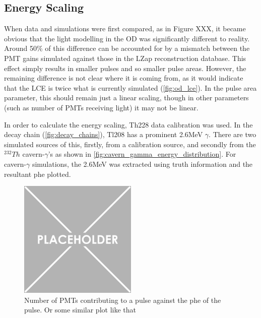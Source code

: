 \subsection{Energy Scaling}
\par
When data and simulations were first compared, as in Figure XXX, it became obvious that the light modelling in the OD was significantly different to reality.
Around 50\% of this difference can be accounted for by a mismatch between the PMT gains simulated against those in the LZap reconstruction database.
This effect simply results in smaller pulses and so smaller pulse areas.
However, the remaining difference is not clear where it is coming from, as it would indicate that the LCE is twice what is currently simulated (\autoref{fig:od_lce}).
In the pulse area parameter, this should remain just a linear scaling, though in other parameters (such as number of PMTs receiving light) it may not be linear.

\par
In order to calculate the energy scaling, Th228 data calibration was used. 
In the decay chain (\autoref{fig:decay_chains}), Tl208 has a prominent 2.6MeV $\gamma$. 
There are two simulated sources of this, firstly, from a calibration source, and secondly from the ${}^{232}Th$ cavern-$\gamma$'s as shown in \autoref{fig:cavern_gamma_energy_distribution}.
For cavern-$\gamma$ simulations, the 2.6MeV was extracted using truth information and the resultant phe plotted.


\begin{figure}
    \centering
    \includegraphics[width=0.5\textwidth]{Figures/Placeholder.png}
    \caption{Number of PMTs contributing to a pulse against the phe of the pulse. Or some similar plot like that}
    \label{fig:OD_coincidence_difference}
\end{figure}


